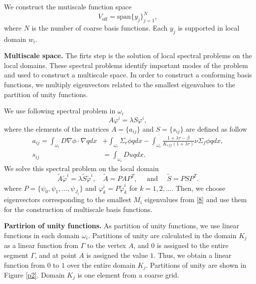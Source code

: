 \documentclass[runningheads]{llncs}
\begin{document}
We construct the mutiscale function space
\[
{V}_{\text{off}} = \mbox{span} \{ y_j \}_{j=1}^{N},
\]
where $N$ is the number of coarse basis functions.
Each $y_j$ is supported in local domain $w_i$.

\textbf{Multiscale space.}
The firts step is the solution of local spectral problems on the local domains. These spectral problems identify important modes of the problem and used to construct a multiscale space. In order to construct a conforming basis functions, we multiply eigenvectors related to the smallest eigenvalues to the partition of unity functions.
 
We use following spectral problem in $\omega_i$
\begin{equation} \label{6}
A \varphi^i = \lambda S \varphi^i,
\end{equation} 
where the elements of the matrices $A= \{ a_{ij} \}$ and $S = \{ s_{ij} \}$ are defined as follow{
\begin{equation} \label{7}
\begin{split}
a_{ij} = 
\int_{\omega_i} D \nabla\phi \cdot \nabla q dx &+ 
\int_{\omega_i} \Sigma_r \phi q dx - 
\int_{\omega_i} \frac{1+\lambda\tau-\beta}{K_{eff}(1+\lambda\tau)} \nu \Sigma_f \phi q dx, \\
s_{ij} &= \int_{\omega _i} D u q dx.
\end{split}
\end{equation}}
We solve this spectral problem on the local domain
\begin{equation} \label{8}
\tilde{A} \tilde{\varphi}^i = \lambda \tilde{S}  \tilde{\varphi}^i, \quad
\tilde{A} = P A P^T, \quad \text{ and } \quad 
\tilde{S} = P S P^T.
\end{equation}
where $P = \{ \psi_0, \psi_1, ...,\psi_{J_i} \}$ and {$\varphi^i_k = P \tilde{\varphi}^i_k$} for $k = 1,2,...$.
{Then, we choose eigenvectors corresponding to the smallest $M_{i}$ eigenvalues from \eqref{8} and use them for the construction of multiscale basis functions.} 

\textbf{Partirion of unity functions. } As  partition of unity functions, we use linear functions in each domain $\omega_i$.
Partitions of unity are calculated in the domain $ K_j $ as a linear function from $\Gamma$ to the vertex $ A $, and $ 0 $ is assigned to the entire segment $\Gamma$, and at point $ A $ is assigned the value $1$. 
Thus, we obtain a linear function from $ 0 $ to $ 1 $ over the entire domain $ K_j $. 
Partitions of unity are shown in Figure \ref{p2}. 
Domain $K_j$  is one element from a coarse grid. 
\end{document}
